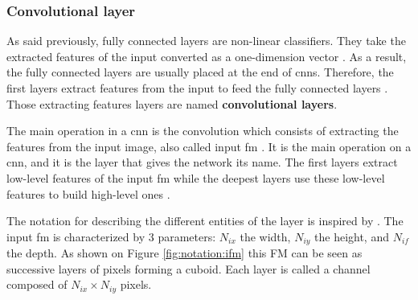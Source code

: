\subsubsection{Convolutional layer} \label{subs:2dconv}
%
As said previously, fully connected layers are non-linear classifiers. They take the extracted features of the input converted as a one-dimension vector \cite{khan_survey_2020}. As a result, the fully connected layers are usually placed at the end of \acrshort{cnn}s. Therefore, the first layers extract features from the input to feed the fully connected layers \cite{liu_fpga-based_2019}. Those extracting features layers are named \textbf{convolutional layers}.

The main operation in a \acrshort{cnn} is the convolution which consists of extracting the features from the input image, also called input \acrfull{fm} \cite{liu_fpga-based_2019, zhao_towards_2018}. It is the main operation on a \acrshort{cnn}, and it is the layer that gives the network its name. The first layers extract low-level features of the input \acrshort{fm} while the deepest layers use these low-level features to build high-level ones \cite{goodfellow_deep_2016}.

The notation for describing the different entities of the layer is inspired by \textcite{ma_optimizing_2018}. The input \acrshort{fm} is characterized by 3 parameters: \textbf{$N_{ix}$} the width, \textbf{$N_{iy}$} the height, and \textbf{$N_{if}$} the depth. As shown on Figure \ref{fig:notation:ifm} this FM can be seen as successive layers of pixels forming a cuboid. Each layer is called a channel composed of $N_{ix} \times N_{iy}$ pixels.

